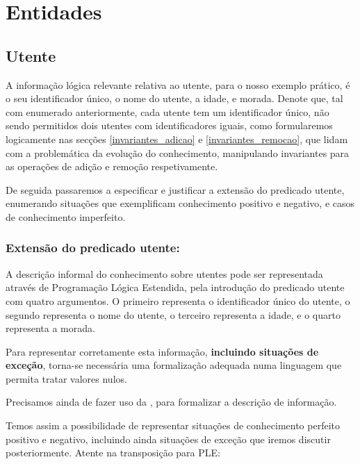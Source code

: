 \documentclass[
  oneside,
  10pt, a4paper,
  footinclude=true,
  headinclude=true,
  cleardoublepage=empty
]{scrbook}
\begin{document}
    \section{Entidades}
        \subsection{Utente}
        A informação lógica relevante relativa ao utente, para o nosso exemplo prático, é o seu identificador único, o nome do utente, a idade, e morada. Denote que, tal com enumerado anteriormente, cada utente tem um identificador único, não sendo permitidos dois utentes com identificadores iguais, como formularemos logicamente nas secções \ref{invariantes_adicao} e \ref{invariantes_remocao}, que lidam com a problemática da evolução do conhecimento, manipulando invariantes para as operações de adição e remoção respetivamente.\par 
        De seguida passaremos a especificar e justificar a extensão do predicado utente, enumerando situações que exemplificam conhecimento positivo e negativo, e casos de conhecimento imperfeito.\par 
        
        \subsubsection{\textbf{Extensão do predicado utente:}}
        
        A descrição informal do conhecimento sobre utentes pode ser representada através de Programação Lógica Estendida, pela introdução do predicado utente com quatro argumentos. O primeiro representa o identificador único do utente, o segundo representa o nome do utente, o terceiro representa a idade, e o quarto representa a morada.\par 
        
Para representar corretamente esta informação, \textbf{incluindo situações de exceção}, torna-se necessária uma formalização adequada  numa linguagem que permita tratar valores nulos. \par
Precisamos ainda de fazer uso da , para formalizar a descrição de informação.\par 
Temos assim a possibilidade de representar situações de conhecimento perfeito positivo e negativo, incluindo ainda situações de exceção que iremos discutir posteriormente. Atente na transposição para PLE:\par 
\end{document}
